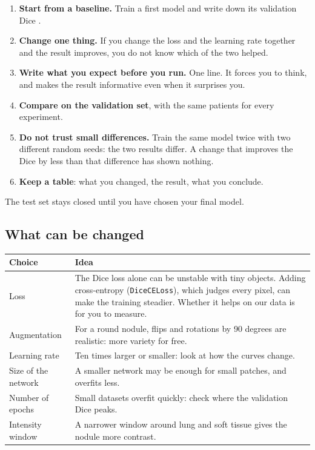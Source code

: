 \documentclass[11pt,a4paper]{article}
\newcommand{\code}[1]{\texttt{\small #1}}
\begin{document}
\begin{enumerate}
\item \textbf{Start from a baseline.} Train a first model and write down its validation Dice \cite{isensee2024revisited}.
\item \textbf{Change one thing.} If you change the loss and the learning rate together and the result
improves, you do not know which of the two helped.
\item \textbf{Write what you expect before you run.} One line. It forces you to think, and makes the
result informative even when it surprises you.
\item \textbf{Compare on the validation set}, with the same patients for every experiment.
\item \textbf{Do not trust small differences.} Train the same model twice with two different random seeds: the
two results differ. A change that improves the Dice by less than that difference has shown nothing.
\item \textbf{Keep a table}: what you changed, the result, what you conclude.
\end{enumerate}

The test set stays closed until you have chosen your final model.

\subsection{What can be changed}

\begin{center}
\begin{tabular}{@{}p{3.6cm}p{11.2cm}@{}}
\toprule
Choice & Idea \\
\midrule
Loss & The Dice loss alone can be unstable with tiny objects. Adding cross-entropy (\code{DiceCELoss}), which
judges every pixel, can make the training steadier. Whether it helps on our data is for you to measure. \\
Augmentation & For a round nodule, flips and rotations by 90 degrees are realistic: more variety for free. \\
Learning rate & Ten times larger or smaller: look at how the curves change. \\
Size of the network & A smaller network may be enough for small patches, and overfits less. \\
Number of epochs & Small datasets overfit quickly: check where the validation Dice peaks. \\
Intensity window & A narrower window around lung and soft tissue gives the nodule more contrast. \\
\bottomrule
\end{tabular}
\end{center}
\end{document}
